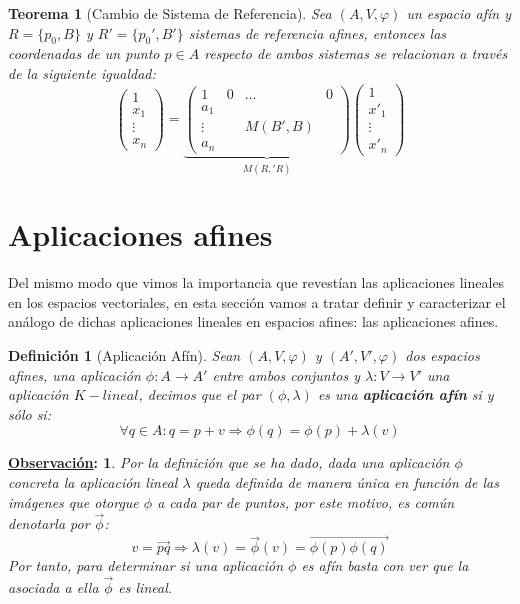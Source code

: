 \documentclass[10pt,a4paper,openright]{book}
\theoremstyle{break}
\newtheorem*{defi}{Definición}
\newtheorem*{theo}{Teorema}
\newtheorem*{obs}{\underline{Observación}:}
\begin{document}
\begin{theo}[Cambio de Sistema de Referencia]
Sea $(A,V,\varphi)$ un espacio afín y $R=\{p_0,B\}$ y $R'=\{p_0', B'\}$ sistemas de referencia afines, entonces las coordenadas de un punto $p\in A$ respecto de ambos sistemas se relacionan a través de la siguiente igualdad:
$$\begin{pmatrix}
1 \\ x_1 \\ \vdots \\ x_n
\end{pmatrix} = \underbrace{\left(\begin{array}{c|ccc}
1  & 0 & \ldots & 0 \\
\hline
a_1  &  & & \\
\vdots &  & M(B',B)& \\
a_n & & &
\end{array}
\right)}_{M(R,'R)} \begin{pmatrix}
1 \\ x'_1 \\ \vdots \\ x'_n
\end{pmatrix}$$
\end{theo}

\section{Aplicaciones afines}
Del mismo modo que vimos la importancia que revestían las aplicaciones lineales en los espacios vectoriales, en esta sección vamos a tratar definir y caracterizar el análogo de dichas aplicaciones lineales en espacios afines: las aplicaciones afines.

\begin{defi}[Aplicación Afín]
Sean $(A,V,\varphi)$  y $(A',V', \varphi)$ dos espacios afines, una aplicación $\phi: A\rightarrow A'$ entre ambos conjuntos y $\lambda: V\rightarrow V'$ una aplicación $K-lineal$, decimos que el par $(\phi, \lambda)$ es una \textbf{aplicación afín} si y sólo si:
$$\forall q \in A: q = p+v\Rightarrow \phi(q) = \phi(p)+\lambda(v)$$
\end{defi}

\begin{obs}
Por la definición que se ha dado, dada una aplicación $\phi$ concreta la aplicación lineal $\lambda$ queda definida de manera única en función de las imágenes que otorgue $\phi$ a cada par de puntos, por este motivo,  es común denotarla por $\vec{\phi}$:
$$v=\vec{pq}\Rightarrow \lambda (v) = \vec{\phi}(v) = \overrightarrow{\phi(p)\phi(q)}$$
Por tanto, para determinar si una aplicación $\phi$ es afín basta con ver que la asociada a ella $\vec{\phi}$ es lineal.
\end{obs}
\end{document}
